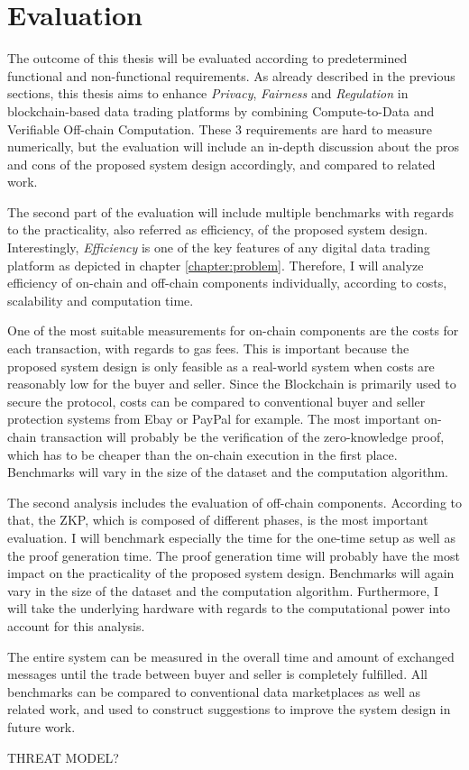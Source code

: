 \chapter{Evaluation}
\label{cha:evaluation}

The outcome of this thesis will be evaluated according to predetermined functional and non-functional requirements. As already described in the previous sections, this thesis aims to enhance \emph{Privacy}, \emph{Fairness} and \emph{Regulation} in blockchain-based data trading platforms by combining Compute-to-Data and Verifiable Off-chain Computation. These 3 requirements are hard to measure numerically, but the evaluation will include an in-depth discussion about the pros and cons of the proposed system design accordingly, and compared to related work. %

The second part of the evaluation will include multiple benchmarks with regards to the practicality, also referred as efficiency, of the proposed system design. Interestingly, \emph{Efficiency} is one of the key features of any digital data trading platform as depicted in chapter \ref{chapter:problem}. %
Therefore, I will analyze efficiency of on-chain and off-chain components individually, according to costs, scalability and computation time.

One of the most suitable measurements for on-chain components are the costs for each transaction, with regards to gas fees. This is important because the proposed system design is only feasible as a real-world system when costs are reasonably low for the buyer and seller. Since the Blockchain is primarily used to secure the protocol, costs can be compared to conventional buyer and seller protection systems from Ebay or PayPal for example. The most important on-chain transaction will probably be the verification of the zero-knowledge proof, which has to be cheaper than the on-chain execution in the first place. Benchmarks will vary in the size of the dataset and the computation algorithm.

The second analysis includes the evaluation of off-chain components. According to that, the ZKP, which is composed of different phases, is the most important evaluation. I will benchmark especially the time for the one-time setup as well as the proof generation time. The proof generation time will probably have the most impact on the practicality of the proposed system design. Benchmarks will again vary in the size of the dataset and the computation algorithm. Furthermore, I will take the underlying hardware with regards to the computational power into account for this analysis. 

The entire system can be measured in the overall time and amount of exchanged messages until the trade between buyer and seller is completely fulfilled. All benchmarks can be compared to conventional data marketplaces as well as related work, and used to construct suggestions to improve the system design in future work.

THREAT MODEL?

